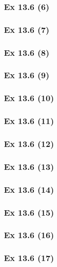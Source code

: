 \subsubsection{Ex 13.6 (6)}\label{sec:Ex_13.6.6}

\subsubsection{Ex 13.6 (7)}\label{sec:Ex_13.6.7}

\subsubsection{Ex 13.6 (8)}\label{sec:Ex_13.6.8}

\subsubsection{Ex 13.6 (9)}\label{sec:Ex_13.6.9}

\subsubsection{Ex 13.6 (10)}\label{sec:Ex_13.6.10}

\newpage		%

\subsubsection{Ex 13.6 (11)}\label{sec:Ex_13.6.11}

\subsubsection{Ex 13.6 (12)}\label{sec:Ex_13.6.12}

\subsubsection{Ex 13.6 (13)}\label{sec:Ex_13.6.13}

\subsubsection{Ex 13.6 (14)}\label{sec:Ex_13.6.14}

\subsubsection{Ex 13.6 (15)}\label{sec:Ex_13.6.15}

\subsubsection{Ex 13.6 (16)}\label{sec:Ex_13.6.16}

\subsubsection{Ex 13.6 (17)}\label{sec:Ex_13.6.17}







